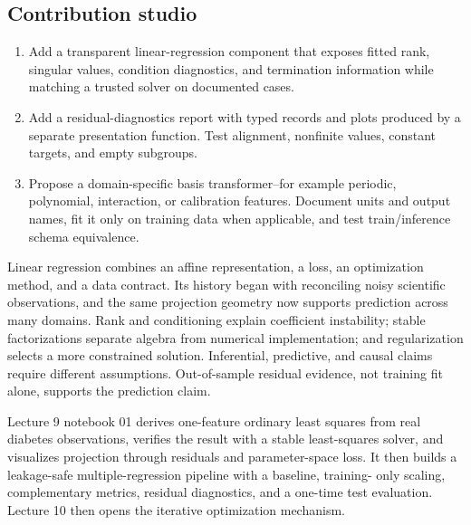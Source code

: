 \subsection*{Contribution studio}

\begin{enumerate}[label=\textbf{LR-PR\arabic*.},leftmargin=*,itemsep=0.65em]
  \item Add a transparent linear-regression component that exposes fitted rank,
  singular values, condition diagnostics, and termination information while
  matching a trusted solver on documented cases.
  \item Add a residual-diagnostics report with typed records and plots produced
  by a separate presentation function. Test alignment, nonfinite values,
  constant targets, and empty subgroups.
  \item Propose a domain-specific basis transformer--for example periodic,
  polynomial, interaction, or calibration features. Document units and output
  names, fit it only on training data when applicable, and test train/inference
  schema equivalence.
\end{enumerate}

\begin{chapterreview}
Linear regression combines an affine representation, a loss, an optimization
method, and a data contract. Its history began with reconciling noisy scientific
observations, and the same projection geometry now supports prediction across
many domains. Rank and conditioning explain coefficient instability; stable
factorizations separate algebra from numerical implementation; and
regularization selects a more constrained solution. Inferential, predictive,
and causal claims require different assumptions. Out-of-sample residual
evidence, not training fit alone, supports the prediction claim.
\end{chapterreview}

\begin{notebooklink}
Lecture 9 notebook 01 derives one-feature ordinary least squares from real
diabetes observations, verifies the result with a stable least-squares solver,
and visualizes projection through residuals and parameter-space loss. It then
builds a leakage-safe multiple-regression pipeline with a baseline, training-
only scaling, complementary metrics, residual diagnostics, and a one-time test
evaluation. Lecture 10 then opens the iterative optimization mechanism.
\end{notebooklink}
